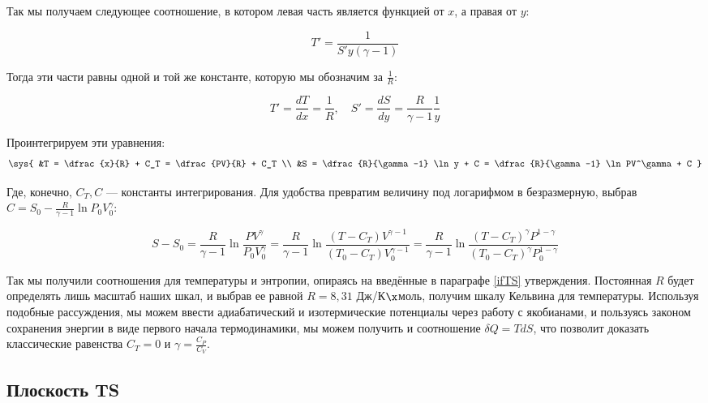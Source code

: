 \documentclass[12pt]{kiarticle}
\newcommand{\del}{\ensuremath{\delta}}
\begin{document}
Так мы получаем следующее соотношение, в котором левая часть является функцией от $ x $, а правая от $ y $:

\begin{equation}\label{T'S'}
T' = \dfrac{1}{S'y(\gamma - 1)}
\end{equation}

Тогда эти части равны одной и той же константе, которую мы обозначим за $ \frac{1}{R} $:

\begin{equation}\label{R}
T' = \dfrac{dT}{dx} = \dfrac{1}{R}, \quad S' = \dfrac{dS}{dy} = \dfrac{R}{\gamma - 1} \dfrac{1}{y}
\end{equation}

Проинтегрируем эти уравнения:
\begin{equation}\label{TS}
\sys{
&T = \dfrac{x}{R} + C_T = \dfrac{PV}{R}  + C_T \\
&S = \dfrac{R}{\gamma -1} \ln y + C =  \dfrac{R}{\gamma -1} \ln PV^\gamma + C
}
\end{equation} 

Где, конечно, $ C_T, C $ --- константы интегрирования. Для удобства превратим величину под логарифмом в безразмерную, выбрав $ C = S_0 - \frac{R}{\gamma -1} \ln P_0V^\gamma_0$:

\begin{equation}\label{S}
S - S_0 = \dfrac{R}{\gamma -1} \ln  \dfrac{PV^\gamma}{P_0V_0^\gamma} = \dfrac{R}{\gamma -1} \ln \dfrac{(T - C_T) V^{\gamma - 1}}{(T_0 - C_T) V^{\gamma -1 }_0} = \dfrac{R}{\gamma -1} \ln \frac{(T - C_T)^\gamma P^{1 - \gamma}}{(T_0 - C_T)^\gamma P_0^{1 -\gamma}}
\end{equation}

Так мы получили соотношения для температуры и энтропии, опираясь на введённые в параграфе \ref{ifTS} утверждения. Постоянная $ R $ будет определять лишь масштаб наших шкал, и выбрав ее равной $ R = 8,31 $ Дж/К$ \x $моль, получим шкалу Кельвина для температуры. Используя подобные рассуждения, мы можем ввести адиабатический и изотермические потенциалы через работу с якобианами, и пользуясь законом сохранения энергии в виде первого начала термодинамики, мы можем получить и соотношение $ \del Q = TdS $, что позволит доказать классические  равенства $ C_T = 0 $ и  $ \gamma = \frac{C_P}{C_V}  $.

\subsection{Плоскость TS}
\end{document}
